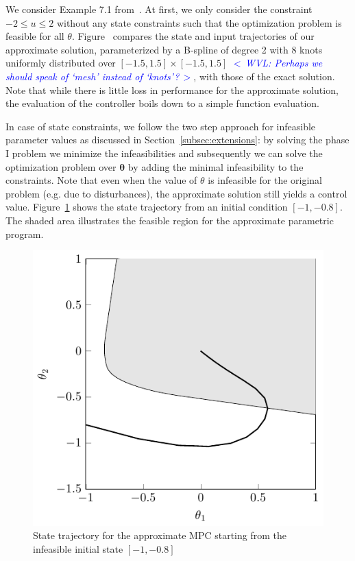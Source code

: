 \documentclass{article}
\newcommand{\commentWVL}[1]{\noindent \textcolor{blue}{\emph{$<\,$WVL: #1$\,>$}}}%
\newcommand{\ppar}{\theta}                          %
\newcommand{\Ppar}{{\bm{\theta}}}                   %
\begin{document}
We consider Example 7.1 from~\cite{Bemporad_et_al_2002}. At first, we only
consider the constraint $-2 \leq u \leq 2$ without any state constraints such
that the optimization problem is feasible for all $\ppar$. Figure~ compares
the state and input trajectories of our approximate solution, parameterized by
a B-spline of degree 2 with 8 knots uniformly distributed over $[-1.5,
1.5]\times[-1.5, 1.5]$ \commentWVL{Perhaps we should speak of `mesh' instead
of `knots'?}, with those of the exact solution. Note that while there is
little loss in performance for the approximate solution, the evaluation of the
controller boils down to a simple function evaluation.

In case of state constraints, we follow the two step approach for infeasible
parameter values as discussed in Section~\ref{subsec:extensions}: by solving
the phase I problem we minimize the infeasibilities and subsequently we can
solve the optimization problem over $\Ppar$ by adding the minimal
infeasibility to the constraints. Note that even when the value of $\ppar$ is
infeasible for the original problem (e.g. due to disturbances), the
approximate solution still yields a control value.
Figure~\ref{fig:MPC_Bemporad2002} shows the state trajectory from an initial
condition $[-1, -0.8]$. The shaded area illustrates the feasible region for
the approximate parametric program.

\begin{figure}
\centering
\includegraphics{figures/mpc_bemporad2002_if_tikz.pdf}
\caption{State trajectory for the approximate MPC starting from the infeasible
initial state $[-1, -0.8]$}\label{fig:MPC_Bemporad2002}
\end{figure}
\end{document}
